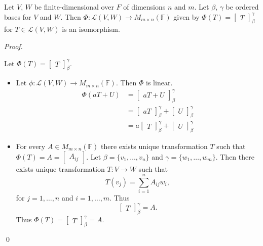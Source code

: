 \documentclass[12pt]{article}
\newenvironment{theorem}[2][Theorem]{\begin{trivlist}
\item[\hskip \labelsep {\bfseries #1}\hskip \labelsep {\bfseries #2.}]}{\end{trivlist}}
\newenvironment{sol}
    {\emph{Proof.}
    }
    {
    \qed
    }
\begin{document}
\begin{theorem}{2.20}
Let $V$, $W$ be finite-dimensional over $F$ of dimensions $n$ and $m$. Let $\beta$, $\gamma$ be ordered bases for $V$ and $W$. Then $\Phi : \mathcal{L}(V, W) \to M_{m \times n}(\mathbb{F})$ given by $\Phi(T) = \begin{bmatrix} T \end{bmatrix}_\beta^\gamma$ for $T \in \mathcal{L}(V, W)$ is an isomorphism.
\end{theorem}

\begin{sol}
Let $\Phi(T) = \begin{bmatrix}
T
\end{bmatrix}_\beta^\gamma$. 

\begin{itemize}
    \item[(1)] Let $\phi : \mathcal{L}(V,W) \to M_{m \times n}(\mathbb{F})$. Then $\Phi$ is linear. \begin{align*}
        \Phi(aT + U) &= \begin{bmatrix}
        aT + U
        \end{bmatrix}_\beta^\gamma \\ &= \begin{bmatrix}
        aT
        \end{bmatrix}_\beta^\gamma + \begin{bmatrix}
        U
        \end{bmatrix}_\beta^\gamma \\
        &= a\begin{bmatrix}
        T
        \end{bmatrix}_\beta^\gamma + \begin{bmatrix}
        U
        \end{bmatrix}_\beta^\gamma
    \end{align*}
    
    \item[(2)] For every $A \in M_{m \times n}(\mathbb{F})$ there exists unique transformation $T$ such that $\Phi(T) = A = \begin{bmatrix}
    A_{ij}
    \end{bmatrix}$. Let $\beta = \{v_1, \dots, v_n\}$ and $\gamma = \{w_1, \dots, w_m\}$. Then there exists unique transformation $T : V \to W$ such that $$T(v_j) = \sum_{i = 1}^n A_{ij}w_i,$$ for $j = 1, \dots, n$ and $i = 1, \dots, m$. Thus $$\begin{bmatrix}
        T
        \end{bmatrix}_\beta^\gamma = A.$$
    Thus $\Phi(T) = \begin{bmatrix}
    T
    \end{bmatrix}_\beta^\gamma = A$.
\end{itemize}
\end{sol}
\end{document}
